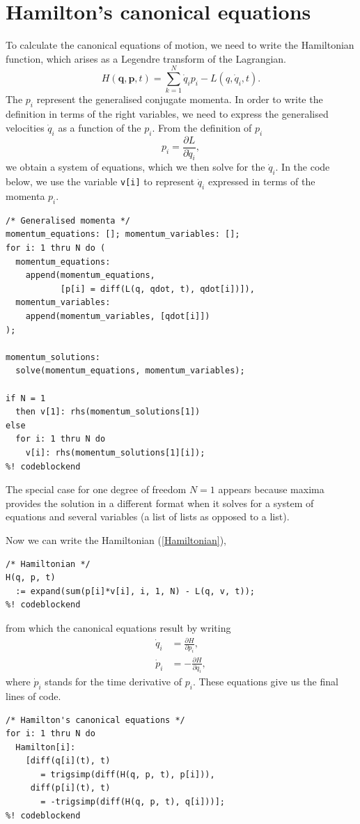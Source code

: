 \documentclass{article}
\begin{document}
\section{Hamilton's canonical equations}

To calculate the canonical equations of motion, we need to write the Hamiltonian
function, which arises as a Legendre transform of the Lagrangian.
\begin{equation}
\label{Hamiltonian}
  H(\mathbf{q}, \mathbf{p}, t)
    = \sum_{k = 1}^N \dot{q}_i p_i - L(q, \dot{q}_i, t).
\end{equation}
The $p_i$ represent the generalised conjugate momenta. In order to write the
definition in terms of the right variables, we need to express the generalised
velocities $\dot{q}_i$ as a function of the $p_i$. From the definition of $p_i$
\begin{equation}
  p_i = \frac{\partial L}{\partial \dot{q}_i},
\end{equation}
we obtain a system of equations, which we then solve for the $\dot{q}_i$. In the
code below, we use the variable \texttt{v[i]} to represent $\dot{q}_i$ expressed
in terms of the momenta $p_i$.
\begin{lstlisting}[frame=single]
%! codeblock: generalised_momenta
/* Generalised momenta */
momentum_equations: []; momentum_variables: [];
for i: 1 thru N do (
  momentum_equations:
    append(momentum_equations,
           [p[i] = diff(L(q, qdot, t), qdot[i])]),
  momentum_variables:
    append(momentum_variables, [qdot[i]])
);

momentum_solutions:
  solve(momentum_equations, momentum_variables);

if N = 1
  then v[1]: rhs(momentum_solutions[1])
else
  for i: 1 thru N do
    v[i]: rhs(momentum_solutions[1][i]);
%! codeblockend
\end{lstlisting}
The special case for one degree of freedom $N = 1$ appears because maxima
provides the solution in a different format when it solves for a system of
equations and several variables (a list of lists as opposed to a list).

Now we can write the Hamiltonian (\ref{Hamiltonian}),
\begin{lstlisting}[frame=single]
%! codeblock: Hamiltonian
/* Hamiltonian */
H(q, p, t)
  := expand(sum(p[i]*v[i], i, 1, N) - L(q, v, t));
%! codeblockend
\end{lstlisting}
from which the canonical equations result by writing
\begin{align}
  \dot{q}_i & = \frac{\partial H}{\partial p_i}, \\
  \dot{p}_i & = -\frac{\partial H}{\partial q_i},
\end{align}
where $\dot{p}_i$ stands for the time derivative of $p_i$. These equations give 
us the final lines of code.
\begin{lstlisting}[frame=single]
%! codeblock: canonical
/* Hamilton's canonical equations */
for i: 1 thru N do
  Hamilton[i]:
    [diff(q[i](t), t)
       = trigsimp(diff(H(q, p, t), p[i])),
     diff(p[i](t), t)
       = -trigsimp(diff(H(q, p, t), q[i]))];
%! codeblockend
\end{lstlisting}
\end{document}
